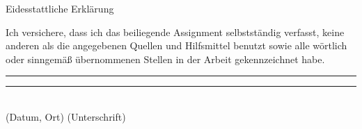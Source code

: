 \documentclass[a4paper,12pt]{article}
\begin{document}
\pagestyle{empty} 
\thispagestyle{empty}

\begin{center}
{\Large Eidesstattliche Erklärung}
\vspace*{4cm}\end{center}
\noindent
Ich versichere, dass ich das beiliegende Assignment selbstständig verfasst, keine anderen als die angegebenen Quellen und Hilfsmittel benutzt sowie alle wörtlich oder sinngemäß übernommenen Stellen in der Arbeit gekennzeichnet habe. 
\vspace{3cm}

\rule[0.5ex]{6.5cm}{1pt}
\hfill
\rule[0.5ex]{6.5cm}{1pt}
\\(Datum, Ort)
\hfill
(Unterschrift)
\end{document}
